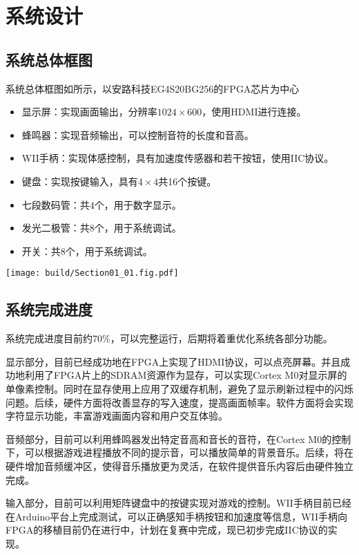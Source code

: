 \section{系统设计}

\subsection{系统总体框图}

系统总体框图如所示，以安路科技EG4S20BG256的FPGA芯片为中心
\begin{itemize}
    \item 显示屏：实现画面输出，分辨率$1024\times 600$，使用HDMI进行连接。
    \item 蜂鸣器：实现音频输出，可以控制音符的长度和音高。
    \item WII手柄：实现体感控制，具有加速度传感器和若干按钮，使用IIC协议。
    \item 键盘：实现按键输入，具有$4\times 4$共16个按键。
    \item 七段数码管：共$4$个，用于数字显示。
    \item 发光二极管：共$8$个，用于系统调试。
    \item 开关：共$8$个，用于系统调试。
\end{itemize}

\begin{Figure}[系统总体框图]
    \texttt{[image: build/Section01\_01.fig.pdf]}
\end{Figure}

\subsection{系统完成进度}

系统完成进度目前约70\%，可以完整运行，后期将着重优化系统各部分功能。

显示部分，目前已经成功地在FPGA上实现了HDMI协议，可以点亮屏幕。并且成功地利用了FPGA片上的SDRAM资源作为显存，可以实现Cortex M0对显示屏的单像素控制。同时在显存使用上应用了双缓存机制，避免了显示刷新过程中的闪烁问题。后续，硬件方面将改善显存的写入速度，提高画面帧率。软件方面将会实现字符显示功能，丰富游戏画面内容和用户交互体验。

音频部分，目前可以利用蜂鸣器发出特定音高和音长的音符，在Cortex M0的控制下，可以根据游戏进程播放不同的提示音，可以播放简单的背景音乐。后续，将在硬件增加音频缓冲区，使得音乐播放更为灵活，在软件提供音乐内容后由硬件独立完成。

输入部分，目前可以利用矩阵键盘中的按键实现对游戏的控制。WII手柄目前已经在Arduino平台上完成测试，可以正确感知手柄按钮和加速度等信息，WII手柄向FPGA的移植目前仍在进行中，计划在复赛中完成，现已初步完成IIC协议的实现。